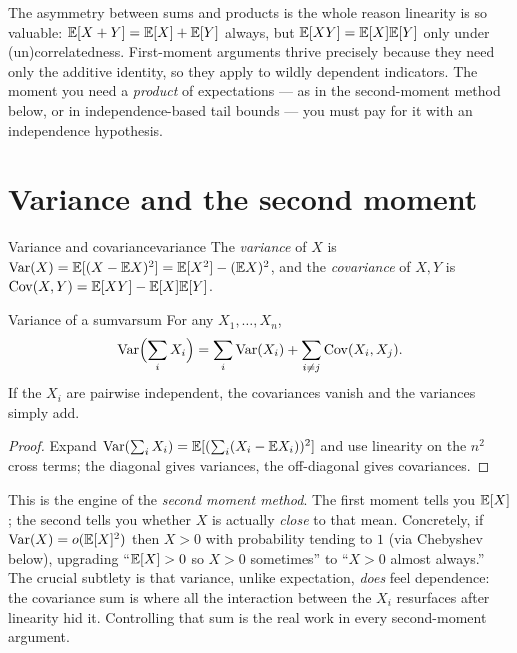 \begin{insight}
The asymmetry between sums and products is the whole reason linearity is so
valuable: $\mathbb{E}[X+Y]=\mathbb{E}[X]+\mathbb{E}[Y]$ always, but $\mathbb{E}[XY]=\mathbb{E}[X]\mathbb{E}[Y]$ only under
(un)correlatedness. First-moment arguments thrive precisely because they need
only the additive identity, so they apply to wildly dependent indicators. The
moment you need a \emph{product} of expectations --- as in the second-moment
method below, or in independence-based tail bounds --- you must pay for it with
an independence hypothesis.
\end{insight}

\section{Variance and the second moment}

\begin{definition}{Variance and covariance}{variance}
The \emph{variance} of $X$ is $\operatorname{Var}(X)=\mathbb{E}[(X-\mathbb{E} X)^2]=\mathbb{E}[X^2]-(\mathbb{E} X)^2$, and the
\emph{covariance} of $X,Y$ is $\operatorname{Cov}(X,Y)=\mathbb{E}[XY]-\mathbb{E}[X]\mathbb{E}[Y]$.
\end{definition}

\begin{proposition}{Variance of a sum}{varsum}
For any $X_1,\dots,X_n$,
\[
  \operatorname{Var}\Bigl(\sum_i X_i\Bigr)=\sum_i\operatorname{Var}(X_i)+\sum_{i\ne j}\operatorname{Cov}(X_i,X_j).
\]
If the $X_i$ are pairwise independent, the covariances vanish and the variances
simply add.
\end{proposition}

\begin{proof}
Expand $\operatorname{Var}(\sum_i X_i)=\mathbb{E}[(\sum_i(X_i-\mathbb{E} X_i))^2]$ and use linearity on the
$n^2$ cross terms; the diagonal gives variances, the off-diagonal gives
covariances.
\end{proof}

\begin{insight}
This is the engine of the \emph{second moment method}. The first moment tells
you $\mathbb{E}[X]$; the second tells you whether $X$ is actually \emph{close} to that
mean. Concretely, if $\operatorname{Var}(X)=o(\mathbb{E}[X]^2)$ then $X>0$ with probability tending
to $1$ (via Chebyshev below), upgrading ``$\mathbb{E}[X]>0$ so $X>0$ sometimes'' to
``$X>0$ almost always.'' The crucial subtlety is that variance, unlike
expectation, \emph{does} feel dependence: the covariance sum is where all the
interaction between the $X_i$ resurfaces after linearity hid it. Controlling
that sum is the real work in every second-moment argument.
\end{insight}

